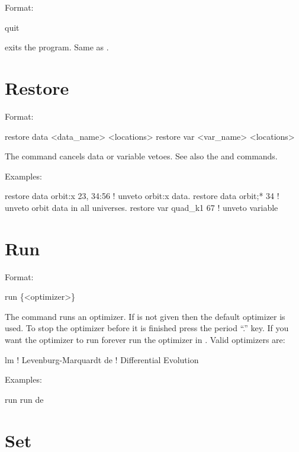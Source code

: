 Format:
\begin{example}
  quit
\end{example}

\vskip 0.2in
 exits the program. Same as .

\section{Restore}
\label{s:restore}

Format:
\begin{example}
  restore data  <data_name> <locations>
  restore var <var_name> <locations>
\end{example}

\vskip 0.2in 
The  command cancels data or variable
vetoes. See also the 
and  commands.

Examples:
\begin{example}
  restore data orbit:x  23, 34:56 ! unveto orbit:x data.
  restore data orbit;* 34         ! unveto orbit data in all universes.
  restore var quad_k1 67          ! unveto variable
\end{example}


\section{Run}
\label{s:run}

Format:
\begin{example}
  run \{<optimizer>\}
\end{example}

\vskip 0.2in The  command runs an optimizer. If
 is not given then the default optimizer is used. To
stop the optimizer before it is finished press the period ``.''
key. If you want the optimizer to run forever run the optimizer in
. Valid optimizers are:
\begin{example}
  lm            ! Levenburg-Marquardt
  de            ! Differential Evolution
\end{example}

Examples:
\begin{example}
  run 
  run de
\end{example}

\section{Set}
\label{s:set}

